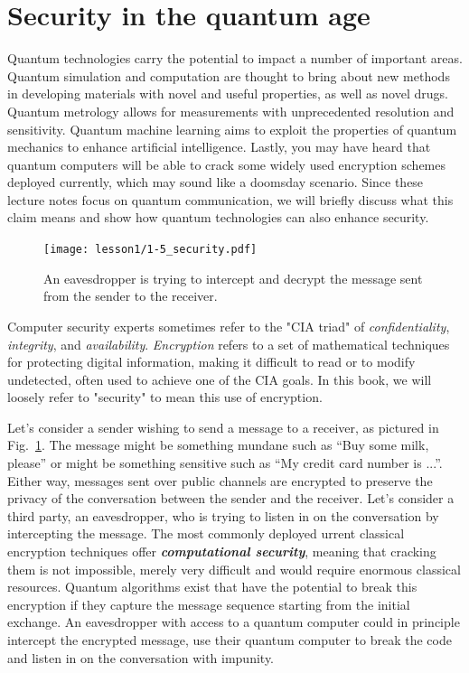 \section{Security in the quantum age}

Quantum technologies carry the potential to impact a number of important areas.
Quantum simulation and computation are thought to bring about new methods in developing materials with novel and useful properties, as well as novel drugs.
Quantum metrology allows for measurements with unprecedented resolution and sensitivity.
Quantum machine learning aims to exploit the properties of quantum mechanics to enhance artificial intelligence.
Lastly, you may have heard that quantum computers will be able to crack some widely used encryption schemes deployed currently, which may sound like a doomsday scenario.
Since these lecture notes focus on quantum communication, we will briefly discuss what this claim means and show how quantum technologies can also enhance security.

\begin{figure}[t]
    \centering
    \texttt{[image: lesson1/1-5\_security.pdf]}
    \caption[Security in the quantum age.]{An eavesdropper is trying to intercept and decrypt the message sent from the sender to the receiver.}
    \label{fig:1-5_security}
\end{figure}

Computer security experts sometimes refer to the "CIA triad" of \emph{confidentiality}, \emph{integrity}, and \emph{availability}. \emph{Encryption} refers to a set of mathematical techniques for protecting digital information, making it difficult to read or to modify undetected, often used to achieve one of the CIA goals. In this book, we will loosely refer to "security" to mean this use of encryption.

Let's consider a sender wishing to send a message to a receiver, as pictured in Fig.~\ref{fig:1-5_security}.
The message might be something mundane such as ``Buy some milk, please'' or might be something sensitive such as ``My credit card number is ...''.
Either way, messages sent over public channels are encrypted to preserve the privacy of the conversation between the sender and the receiver.
Let's consider a third party, an eavesdropper, who is trying to listen in on the conversation by intercepting the message.
The most commonly deployed urrent classical encryption techniques offer \textit{\textbf{computational security}}, meaning that cracking them is not impossible, merely very difficult and would require enormous classical resources.
Quantum algorithms exist that have the potential to break this encryption if they capture the message sequence starting from the initial exchange.
An eavesdropper with access to a quantum computer could in principle intercept the encrypted message, use their quantum computer to break the code and listen in on the conversation with impunity.

